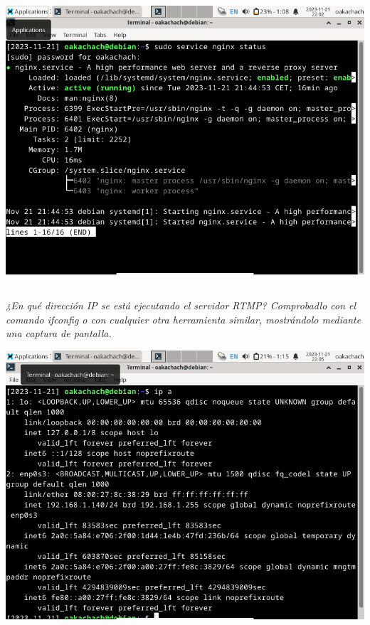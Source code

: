 \documentclass[spanish]{article}
\begin{document}
\begin{center}
\includegraphics[scale=0.45]{../img/1.png}
\end{center}

\newpage

\subsection{}

\textit{¿En qué dirección IP se está ejecutando el servidor
RTMP? Comprobadlo con el comando ifconfig o con cualquier
otra herramienta similar, mostrándolo mediante una captura
de pantalla.}

\begin{center}
\includegraphics[scale=0.45]{../img/2.png}
\end{center}
\end{document}
